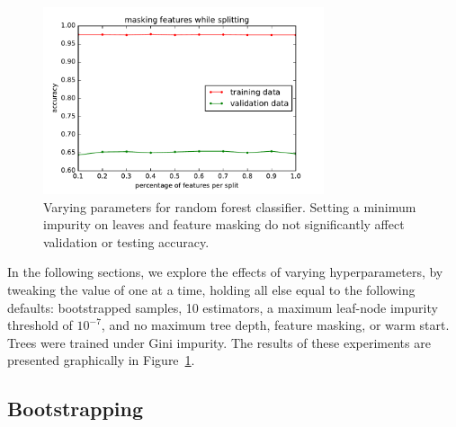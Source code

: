 \documentclass{article}
\newcommand\halfwidth{3.25in}
\begin{document}
\begin{multicols}{2}
\begin{figure}[t]
   \includegraphics[width=\halfwidth]{img/rf-maskingFeatures.pdf}
   \caption{Varying parameters for random forest classifier.
     Setting a minimum impurity on leaves and feature masking
     do not significantly affect validation or testing accuracy.}
   \label{fig:rf-params}
\end{figure}


In the following sections,
we explore the effects of varying hyperparameters,
by tweaking the value of one at a time,
holding all else equal to the following defaults:
bootstrapped samples,
10 estimators,
a maximum leaf-node impurity threshold of $10^{-7}$,
and no maximum tree depth,
feature masking, or warm start.
Trees were trained under Gini impurity.
The results of these experiments
are presented graphically in Figure~\ref{fig:rf-params}.

\subsection{Bootstrapping}


\end{multicols}
\end{document}
